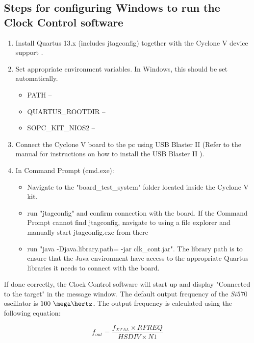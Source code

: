 \documentclass[main.tex]{subfiles}
\begin{document}
\subsection{Steps for configuring Windows to run the Clock Control software}

\begin{enumerate}\setlength{\itemsep}{10pt}
  \item Install Quartus 13.x (includes jtagconfig) together with the Cyclone V device support \cite{altera_q13}.
  \item Set appropriate environment variables. In Windows, this should be set automatically.
  \begin{itemize}\setlength{\itemsep}{10pt}
      \item PATH -- 
      \item QUARTUS\_ROOTDIR -- 
      \item SOPC\_KIT\_NIOS2 -- 
    \end{itemize}
  \item Connect the Cyclone V board to the \gls{pc} using USB Blaster II (Refer to the manual for instructions on how to install the USB Blaster II \cite{altera_usb}).
  \item In Command Prompt (cmd.exe):
  \begin{itemize}\setlength{\itemsep}{10pt}
      \item Navigate to the "board\_test\_system" folder located inside the Cyclone V kit.
      \item run "jtagconfig" and confirm connection with the board. If the Command Prompt cannot find jtagconfig, navigate to  using a file explorer and manually start jtagconfig.exe from there
      \item run "java -Djava.library.path= -jar clk\_cont.jar". The library path is to ensure that the Java environment have access to the appropriate Quartus libraries it needs to connect with the board.
    \end{itemize}
\end{enumerate}

If done correctly, the Clock Control software will start up and display "Connected to the target" in the message window. The default output frequency of the $Si570$ oscillator is $100~\mega\hertz$. The output frequency is calculated using the following equation:

\begin{equation}
    f_{out} = \frac{f_{XTAL} \times RFREQ}{HSDIV \times N1}
\end{equation} 
\end{document}
